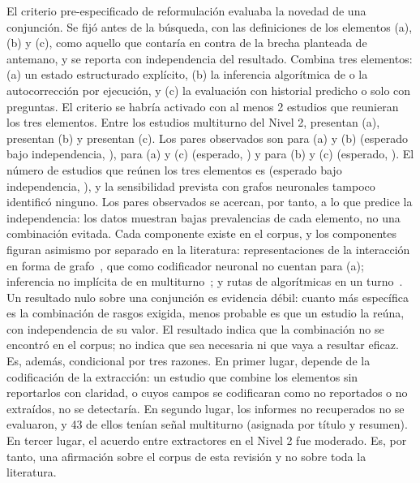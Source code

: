 El criterio pre-especificado de reformulación evaluaba la novedad de una conjunción. Se fijó antes de la búsqueda, con las definiciones de los elementos (a), (b) y (c), como aquello que contaría en contra de la brecha planteada de antemano, y se reporta con independencia del resultado. Combina tres elementos: (a) un estado estructurado explícito, (b) la inferencia algorítmica de  o la autocorrección por ejecución, y (c) la evaluación con historial predicho o solo con preguntas. El criterio se habría activado con al menos 2 estudios que reunieran los tres elementos. Entre los \nMultiturno{} estudios multiturno del Nivel 2, \nMochoA{} presentan (a), \nMochoB{} presentan (b) y \nMochoC{} presentan (c). Los pares observados son \nMochoAB{} para (a) y (b) (esperado bajo independencia, \espMochoAB{}), \nMochoAC{} para (a) y (c) (esperado, \espMochoAC{}) y \nMochoBC{} para (b) y (c) (esperado, \espMochoBC{}). El número de estudios que reúnen los tres elementos es \nBrechaMocho{} (esperado bajo independencia, \espMochoABC{}), y la sensibilidad prevista con grafos neuronales tampoco identificó ninguno. Los pares observados se acercan, por tanto, a lo que predice la independencia: los datos muestran bajas prevalencias de cada elemento, no una combinación evitada. Cada componente existe en el corpus, y los componentes figuran asimismo por separado en la literatura: representaciones de la interacción en forma de grafo~\cite{Cai2020IGSQL}, que como codificador neuronal no cuentan para (a); inferencia no implícita de  en multiturno~\cite{Dou2023UniSAr,Wang2020PGGSQL}; y rutas de  algorítmicas en un turno~\cite{Safdarian2026SchemaGraphSQL}. Un resultado nulo sobre una conjunción es evidencia débil: cuanto más específica es la combinación de rasgos exigida, menos probable es que un estudio la reúna, con independencia de su valor. El resultado indica que la combinación no se encontró en el corpus; no indica que sea necesaria ni que vaya a resultar eficaz. Es, además, condicional por tres razones. En primer lugar, depende de la codificación de la extracción: un estudio que combine los elementos sin reportarlos con claridad, o cuyos campos se codificaran como no reportados o no extraídos, no se detectaría. En segundo lugar, los informes no recuperados no se evaluaron, y 43 de ellos tenían señal multiturno (asignada por título y resumen). En tercer lugar, el acuerdo entre extractores en el Nivel 2 fue moderado. Es, por tanto, una afirmación sobre el corpus de esta revisión y no sobre toda la literatura.

